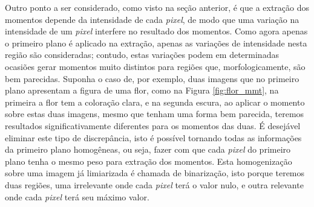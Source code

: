 Outro ponto a ser considerado, como visto na seção anterior, é que
a extração dos momentos depende da intensidade de
cada \textit{pixel}, de modo que uma variação na intensidade de um \textit{pixel}
interfere no resultado dos momentos. Como agora apenas o primeiro plano é
aplicado na extração, apenas as variações de intensidade nesta região são
consideradas; contudo, estas variações podem em determinadas ocasiões gerar
momentos muito distintos para regiões que, morfologicamente, são bem parecidas.
Suponha o caso de, por exemplo, duas imagens que no primeiro plano apresentam a
figura de uma flor, como na Figura \ref{fig:flor_mmt}, na primeira a flor
tem a coloração clara, e na segunda escura, ao aplicar o momento sobre estas
duas imagens, mesmo que tenham uma forma bem parecida, teremos resultados
significativamente diferentes para os momentos das duas. É desejável eliminar
este tipo de discrepância, isto é possível tornando todas as informações da
primeiro plano homogêneas, ou seja, fazer com que cada \textit{pixel} do
primeiro plano tenha o mesmo peso para extração dos momentos. Esta homogenização
sobre uma imagem já limiarizada é chamada de
binarização, isto porque teremos duas regiões, uma irrelevante onde
cada \textit{pixel} terá o valor nulo, e outra relevante onde cada \textit{pixel}
terá seu máximo valor.

